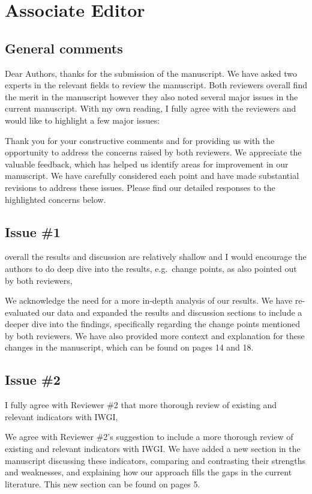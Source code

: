 \section{Associate Editor}\label{editor}

\subsection{General comments}
\RC{} Dear Authors, thanks for the submission of the manuscript. We have asked two experts in the relevant fields to review the manuscript. Both reviewers overall find the merit in the manuscript however they also noted several major issues in the current manuscript. With my own reading, I fully agree with the reviewers and would like to highlight a few major issues:

\AR{} Thank you for your constructive comments and for providing us with the opportunity to address the concerns raised by both reviewers. We appreciate the valuable feedback, which has helped us identify areas for improvement in our manuscript. We have carefully considered each point and have made substantial revisions to address these issues. Please find our detailed responses to the highlighted concerns below.

\subsection{Issue \#1}
\RC{} overall the results and discussion are relatively shallow and I would encourage the authors to do deep dive into the results, e.g.\ change points, as also pointed out by both reviewers,

\AR{} We acknowledge the need for a more in-depth analysis of our results. We have re-evaluated our data and expanded the results and discussion sections to include a deeper dive into the findings, specifically regarding the change points mentioned by both reviewers. We have also provided more context and explanation for these changes in the manuscript, which can be found on pages 14 and 18.

\subsection{Issue \#2}
\RC{} I fully agree with Reviewer \#2 that more thorough review of existing and relevant indicators with IWGI,

\AR{} We agree with Reviewer \#2's suggestion to include a more thorough review of existing and relevant indicators with IWGI. We have added a new section in the manuscript discussing these indicators, comparing and contrasting their strengths and weaknesses, and explaining how our approach fills the gaps in the current literature. This new section can be found on pages 5.

